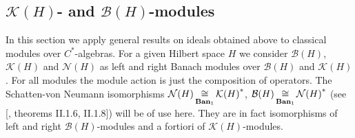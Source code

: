 
\subsection{
    \texorpdfstring{$\mathcal{K}(H)$}{K (H)}- and
    \texorpdfstring{$\mathcal{B}(H)$}{B (H)}-modules
}\label{SubSectionKHAndBHModules}

In this section we apply general results on ideals obtained above to classical
modules over $C^*$-algebras.  For a given Hilbert space $H$ we consider
$\mathcal{B}(H)$, $\mathcal{K}(H)$ and $\mathcal{N}(H)$ as left and right Banach
modules over $\mathcal{B}(H)$ and $\mathcal{K}(H)$. For all modules the module
action is just the composition of operators. The Schatten-von Neumann
isomorphisms $\mathcal{N}(H)\mathop{\mathbin{\cong}}\limits_{\mathbf{Ban}_1}{\mathcal{K}(H)}^*$,
$\mathcal{B}(H)\mathop{\mathbin{\cong}}\limits_{\mathbf{Ban}_1}{\mathcal{N}(H)}^*$ (see
[\cite{TakThOpAlgVol1}, theorems II.1.6, II.1.8]) will be of use here. They are
in fact isomorphisms of left and right $\mathcal{B}(H)$-modules and a fortiori
of $\mathcal{K}(H)$-modules.

